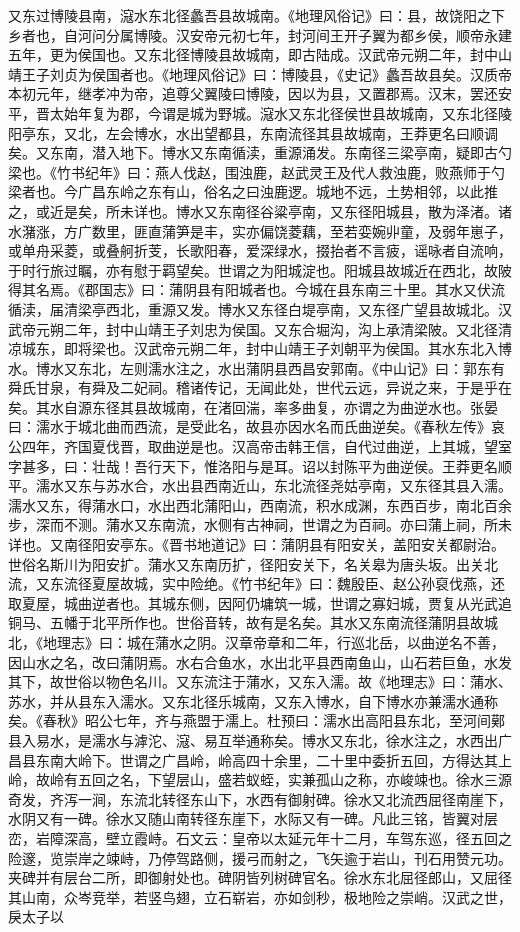 \documentclass[12pt,UTF8]{ctexbook}
\begin{document}
又东过博陵县南，滱水东北径蠡吾县故城南。《地理风俗记》曰：县，故饶阳之下乡者也，自河问分属博陵。汉安帝元初七年，封河间王开子翼为都乡侯，顺帝永建五年，更为侯国也。又东北径博陵县故城南，即古陆成。汉武帝元朔二年，封中山靖王子刘贞为侯国者也。《地理风俗记》曰：博陵县，《史记》蠡吾故县矣。汉质帝本初元年，继孝冲为帝，追尊父翼陵曰博陵，因以为县，又置郡焉。汉末，罢还安平，晋太始年复为郡，今谓是城为野城。滱水又东北径侯世县故城南，又东北径陵阳亭东，又北，左会博水，水出望都县，东南流径其县故城南，王莽更名曰顺调矣。又东南，潜入地下。博水又东南循渎，重源涌发。东南径三梁亭南，疑即古勺梁也。《竹书纪年》曰：燕人伐赵，围浊鹿，赵武灵王及代人救浊鹿，败燕师于勺梁者也。今广昌东岭之东有山，俗名之曰浊鹿逻。城地不远，土势相邻，以此推之，或近是矣，所未详也。博水又东南径谷粱亭南，又东径阳城县，散为泽渚。诸水潴涨，方广数里，匪直蒲笋是丰，实亦偏饶菱藕，至若娈婉丱童，及弱年崽子，或单舟采菱，或叠舸折芰，长歌阳春，爱深绿水，掇抬者不言疲，谣咏者自流响，于时行旅过瞩，亦有慰于羁望矣。世谓之为阳城淀也。阳城县故城近在西北，故陂得其名焉。《郡国志》曰：蒲阴县有阳城者也。今城在县东南三十里。其水又伏流循渎，届清梁亭西北，重源又发。博水又东径白堤亭南，又东径广望县故城北。汉武帝元朔二年，封中山靖王子刘忠为侯国。又东合堀沟，沟上承清梁陂。又北径清凉城东，即将梁也。汉武帝元朔二年，封中山靖王子刘朝平为侯国。其水东北入博水。博水又东北，左则濡水注之，水出蒲阴县西昌安郭南。《中山记》曰：郭东有舜氏甘泉，有舜及二妃祠。稽诸传记，无闻此处，世代云远，异说之来，于是乎在矣。其水自源东径其县故城南，在渚回湍，率多曲复，亦谓之为曲逆水也。张晏曰：濡水于城北曲而西流，是受此名，故县亦因水名而氏曲逆矣。《春秋左传》哀公四年，齐国夏伐晋，取曲逆是也。汉高帝击韩王信，自代过曲逆，上其城，望室字甚多，曰：壮哉！吾行天下，惟洛阳与是耳。诏以封陈平为曲逆侯。王莽更名顺平。濡水又东与苏水合，水出县西南近山，东北流径尧姑亭南，又东径其县入濡。濡水又东，得蒲水口，水出西北蒲阳山，西南流，积水成渊，东西百步，南北百余步，深而不测。蒲水又东南流，水侧有古神祠，世谓之为百祠。亦曰蒲上祠，所未详也。又南径阳安亭东。《晋书地道记》曰：蒲阴县有阳安关，盖阳安关都尉治。世俗名斯川为阳安扩。蒲水又东南历扩，径阳安关下，名关皋为唐头坂。出关北流，又东流径夏屋故城，实中险绝。《竹书纪年》曰：魏殷臣、赵公孙裒伐燕，还取夏屋，城曲逆者也。其城东侧，因阿仍墉筑一城，世谓之寡妇城，贾复从光武追铜马、五幡于北平所作也。世俗音转，故有是名矣。其水又东南流径蒲阴县故城北，《地理志》曰：城在蒲水之阴。汉章帝章和二年，行巡北岳，以曲逆名不善，因山水之名，改曰蒲阴焉。水右合鱼水，水出北平县西南鱼山，山石若巨鱼，水发其下，故世俗以物色名川。又东流注于蒲水，又东入濡。故《地理志》曰：蒲水、苏水，并从县东入濡水。又东北径乐城南，又东入博水，自下博水亦兼濡水通称矣。《春秋》昭公七年，齐与燕盟于濡上。杜预曰：濡水出高阳县东北，至河间鄚县入易水，是濡水与滹沱、滱、易互举通称矣。博水又东北，徐水注之，水西出广昌县东南大岭下。世谓之广昌岭，岭高四十余里，二十里中委折五回，方得达其上岭，故岭有五回之名，下望层山，盛若蚁蛭，实兼孤山之称，亦峻竦也。徐水三源奇发，齐泻一涧，东流北转径东山下，水西有御射碑。徐水又北流西屈径南崖下，水阴又有一碑。徐水又随山南转径东崖下，水际又有一碑。凡此三铭，皆翼对层峦，岩障深高，壁立霞峙。石文云：皇帝以太延元年十二月，车驾东巡，径五回之险邃，览崇岸之竦峙，乃停驾路侧，援弓而射之，飞矢逾于岩山，刊石用赞元功。夹碑并有层台二所，即御射处也。碑阴皆列树碑官名。徐水东北屈径郎山，又屈径其山南，众岑竞举，若竖鸟翅，立石崭岩，亦如剑秒，极地险之崇峭。汉武之世，戾太子以
\end{document}
